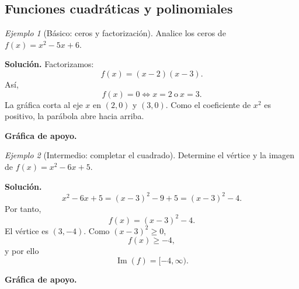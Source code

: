 \documentclass[12pt]{article}
\theoremstyle{remark}
\newtheorem{ejemplo}{Ejemplo}[section]
\newcommand{\Ima}{\operatorname{Im}}
\begin{document}
\subsection{Funciones cuadráticas y polinomiales}

\begin{ejemplo}[Básico: ceros y factorización]
Analice los ceros de $f(x)=x^2-5x+6$.

\textbf{Solución.} Factorizamos:
\[
f(x)=(x-2)(x-3).
\]
Así,
\[
f(x)=0\Longleftrightarrow x=2\ \text{o}\ x=3.
\]
La gráfica corta al eje $x$ en $(2,0)$ y $(3,0)$. Como el coeficiente de $x^2$ es positivo, la parábola abre hacia arriba.


\textbf{Gráfica de apoyo.}\medskip
\begin{center}
\end{center}

\end{ejemplo}

\begin{ejemplo}[Intermedio: completar el cuadrado]
Determine el vértice y la imagen de $f(x)=x^2-6x+5$.

\textbf{Solución.}
\[
x^2-6x+5=(x-3)^2-9+5=(x-3)^2-4.
\]
Por tanto,
\[
\boxed{f(x)=(x-3)^2-4}.
\]
El vértice es $(3,-4)$. Como $(x-3)^2\ge0$,
\[
f(x)\ge-4,
\]
y por ello
\[
\boxed{\Ima(f)=[-4,\infty)}.
\]


\textbf{Gráfica de apoyo.}\medskip
\begin{center}
\end{center}

\end{ejemplo}
\end{document}
